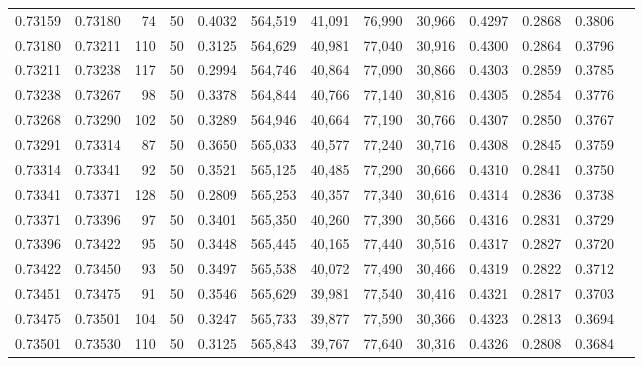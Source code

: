 \begin{tabular}{rrrrrrrrrrrrr}
0.73159 & 0.73180 &    74 &  50 &                                     0.4032 & 564,519 &  41,091 &  76,990 &  30,966 & 0.4297 & 0.2868 & 0.3806 \\
0.73180 & 0.73211 &   110 &  50 &                                     0.3125 & 564,629 &  40,981 &  77,040 &  30,916 & 0.4300 & 0.2864 & 0.3796 \\
0.73211 & 0.73238 &   117 &  50 &                                     0.2994 & 564,746 &  40,864 &  77,090 &  30,866 & 0.4303 & 0.2859 & 0.3785 \\
0.73238 & 0.73267 &    98 &  50 &                                     0.3378 & 564,844 &  40,766 &  77,140 &  30,816 & 0.4305 & 0.2854 & 0.3776 \\
0.73268 & 0.73290 &   102 &  50 &                                     0.3289 & 564,946 &  40,664 &  77,190 &  30,766 & 0.4307 & 0.2850 & 0.3767 \\
0.73291 & 0.73314 &    87 &  50 &                                     0.3650 & 565,033 &  40,577 &  77,240 &  30,716 & 0.4308 & 0.2845 & 0.3759 \\
0.73314 & 0.73341 &    92 &  50 &                                     0.3521 & 565,125 &  40,485 &  77,290 &  30,666 & 0.4310 & 0.2841 & 0.3750 \\
0.73341 & 0.73371 &   128 &  50 &                                     0.2809 & 565,253 &  40,357 &  77,340 &  30,616 & 0.4314 & 0.2836 & 0.3738 \\
0.73371 & 0.73396 &    97 &  50 &                                     0.3401 & 565,350 &  40,260 &  77,390 &  30,566 & 0.4316 & 0.2831 & 0.3729 \\
0.73396 & 0.73422 &    95 &  50 &                                     0.3448 & 565,445 &  40,165 &  77,440 &  30,516 & 0.4317 & 0.2827 & 0.3720 \\
0.73422 & 0.73450 &    93 &  50 &                                     0.3497 & 565,538 &  40,072 &  77,490 &  30,466 & 0.4319 & 0.2822 & 0.3712 \\
0.73451 & 0.73475 &    91 &  50 &                                     0.3546 & 565,629 &  39,981 &  77,540 &  30,416 & 0.4321 & 0.2817 & 0.3703 \\
0.73475 & 0.73501 &   104 &  50 &                                     0.3247 & 565,733 &  39,877 &  77,590 &  30,366 & 0.4323 & 0.2813 & 0.3694 \\
0.73501 & 0.73530 &   110 &  50 &                                     0.3125 & 565,843 &  39,767 &  77,640 &  30,316 & 0.4326 & 0.2808 & 0.3684 \\

\end{tabular}
